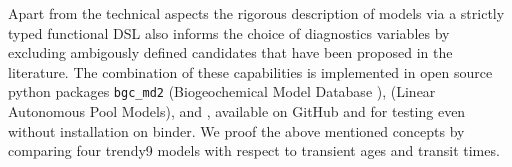 Apart from the technical aspects the rigorous description of models via a
strictly typed functional DSL also informs the choice of diagnostics variables by
excluding ambigously defined candidates that have been proposed in the literature. 
The combination of these capabilities is implemented in open source python
packages \texttt{bgc\_md2} (Biogeochemical Model Database ), 
\LAPM (Linear Autonomous Pool Models),
\CompartmentalSystems  and \ComputabilityGraphs, available on GitHub and for testing even without installation on binder. 
We proof the above mentioned concepts by comparing four trendy9 models with respect to transient ages and transit times.
